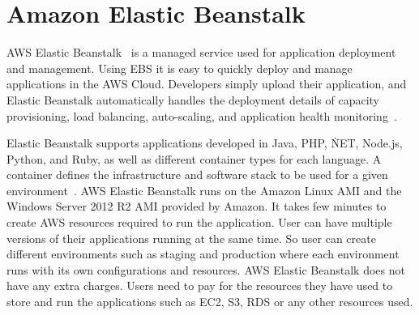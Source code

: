 \section{Amazon Elastic Beanstalk}

AWS Elastic Beanstalk~\cite{hid-sp18-420-amazon-elastic-beanstalk} is a managed
service used for application deployment and management. Using EBS it is easy to
quickly deploy and manage applications in the AWS Cloud. Developers simply
upload their application, and Elastic Beanstalk automatically handles the
deployment details of capacity provisioning, load balancing, auto-scaling, and
application health monitoring~\cite{hid-sp18-420-amazon-elastic-beanstalk-FAQ}.

Elastic Beanstalk supports applications developed in Java, PHP, \.NET, Node.js,
Python, and Ruby, as well as different container types for each language. A
container defines the infrastructure and software stack to be used for a given
environment~\cite{hid-sp18-420-amazon-elastic-beanstalk-FAQ}. AWS Elastic
Beanstalk runs on the Amazon Linux AMI and the Windows Server 2012 R2 AMI
provided by Amazon. It takes few minutes to create AWS resources required to run
the application. User can have multiple versions of their applications running
at the same time. So user can create different environments such as staging and
production where each environment runs with its own configurations and
resources. AWS Elastic Beanstalk does not have any extra charges. Users need to
pay for the resources they have used to store and run the applications such as
EC2, S3, RDS or any other resources used.
